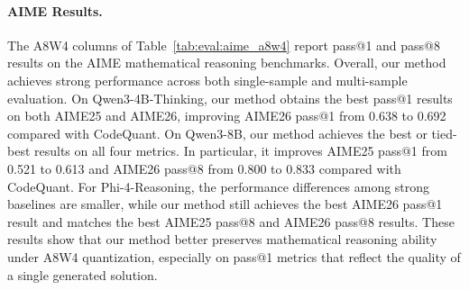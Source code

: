 \documentclass{article}
\begin{document}
\paragraph{AIME Results.}
The A8W4 columns of Table~\ref{tab:eval:aime_a8w4} report pass@1 and pass@8 results on the AIME mathematical reasoning benchmarks. Overall, our method achieves strong performance across both single-sample and multi-sample evaluation. On Qwen3-4B-Thinking, our method obtains the best pass@1 results on both AIME25 and AIME26, improving AIME26 pass@1 from 0.638 to 0.692 compared with CodeQuant. On Qwen3-8B, our method achieves the best or tied-best results on all four metrics. In particular, it improves AIME25 pass@1 from 0.521 to 0.613 and AIME26 pass@8 from 0.800 to 0.833 compared with CodeQuant. For Phi-4-Reasoning, the performance differences among strong baselines are smaller, while our method still achieves the best AIME26 pass@1 result and matches the best AIME25 pass@8 and AIME26 pass@8 results. These results show that our method better preserves mathematical reasoning ability under A8W4 quantization, especially on pass@1 metrics that reflect the quality of a single generated solution.


\newpage

\end{document}
